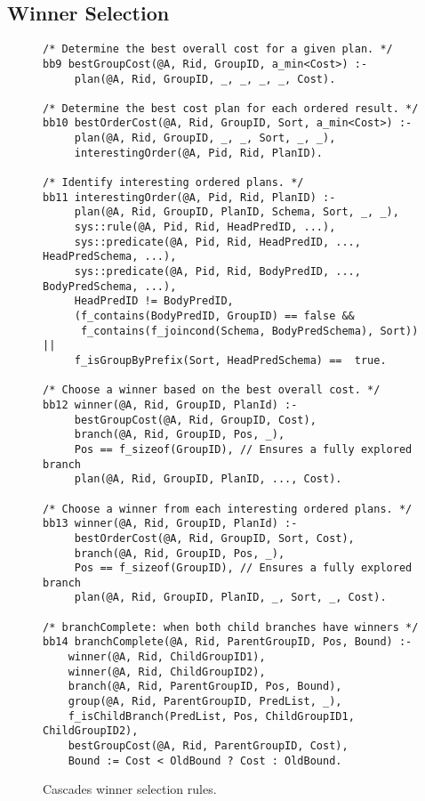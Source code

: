 \subsection{Winner Selection}
\label{ch:opt:sec:cascades_winner}

\begin{figure*}
\ssp
\centering
\begin{lstlisting}
/* Determine the best overall cost for a given plan. */
bb9 bestGroupCost(@A, Rid, GroupID, a_min<Cost>) :-
     plan(@A, Rid, GroupID, _, _, _, _, Cost).

/* Determine the best cost plan for each ordered result. */
bb10 bestOrderCost(@A, Rid, GroupID, Sort, a_min<Cost>) :-
     plan(@A, Rid, GroupID, _, _, Sort, _, _),
     interestingOrder(@A, Pid, Rid, PlanID).

/* Identify interesting ordered plans. */ 
bb11 interestingOrder(@A, Pid, Rid, PlanID) :-
     plan(@A, Rid, GroupID, PlanID, Schema, Sort, _, _),
     sys::rule(@A, Pid, Rid, HeadPredID, ...),
     sys::predicate(@A, Pid, Rid, HeadPredID, ..., HeadPredSchema, ...),
     sys::predicate(@A, Pid, Rid, BodyPredID, ..., BodyPredSchema, ...),
     HeadPredID != BodyPredID, 
     (f_contains(BodyPredID, GroupID) == false &&
      f_contains(f_joincond(Schema, BodyPredSchema), Sort)) ||
     f_isGroupByPrefix(Sort, HeadPredSchema) ==  true.

/* Choose a winner based on the best overall cost. */
bb12 winner(@A, Rid, GroupID, PlanId) :-
     bestGroupCost(@A, Rid, GroupID, Cost),
     branch(@A, Rid, GroupID, Pos, _), 
     Pos == f_sizeof(GroupID), // Ensures a fully explored branch
     plan(@A, Rid, GroupID, PlanID, ..., Cost).

/* Choose a winner from each interesting ordered plans. */
bb13 winner(@A, Rid, GroupID, PlanId) :-
     bestOrderCost(@A, Rid, GroupID, Sort, Cost),
     branch(@A, Rid, GroupID, Pos, _), 
     Pos == f_sizeof(GroupID), // Ensures a fully explored branch
     plan(@A, Rid, GroupID, PlanID, _, Sort, _, Cost).

/* branchComplete: when both child branches have winners */
bb14 branchComplete(@A, Rid, ParentGroupID, Pos, Bound) :-
    winner(@A, Rid, ChildGroupID1),
    winner(@A, Rid, ChildGroupID2),
    branch(@A, Rid, ParentGroupID, Pos, Bound),
    group(@A, Rid, ParentGroupID, PredList, _),
    f_isChildBranch(PredList, Pos, ChildGroupID1, ChildGroupID2),
    bestGroupCost(@A, Rid, ParentGroupID, Cost),
    Bound := Cost < OldBound ? Cost : OldBound.
\end{lstlisting}
\caption{\label{ch:opt:fig:cascades_winner} Cascades winner selection rules.}
\end{figure*}

